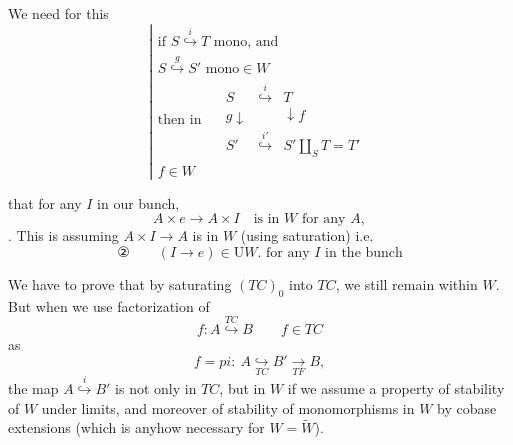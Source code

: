 \documentclass[11pt,a4paper]{article}
\begin{document}
We need for this
\[
  \left|
  \begin{array}{l}
    \text{if } S \overset{i}{\hookrightarrow} T \text{ mono, and} \\
    S \overset{g}{\hookrightarrow} S' \text{ mono} \in W \\
    \text{then in } \quad
    \begin{array}{ccc}
      S & \overset{i}{\hookrightarrow} & T \\
      {\scriptstyle g} \downarrow & & \downarrow {\scriptstyle f} \\
      S' & \overset{i'}{\hookrightarrow} & S' \amalg_S T = T'
    \end{array} \\
    f \in W
  \end{array}
  \right.
\]


 that for any  $I$ \struck{\ill{}} in our
bunch,
\[
  A \times e \to A \times I \quad \text{is in } W \text{ for any } A,
\]
.
This is  \struck{\ill{}} assuming
$A \times I \to A$ is in $W$ (using saturation) i.e.
\[
  \text{②}\qquad
  \boxed{(I \to e) \in \mathrm{U}W. \text{ for any } I \text{ in the bunch}}
\]

We have to prove that by saturating $(TC)_0$ into $TC$, we still remain
within $W$. But when we use factorization of
\[
  f : A \overset{TC}{\hookrightarrow} B \qquad f \in TC
\]
as
\[
  f = pi : \ A \underset{TC}{\hookrightarrow} B' \underset{TF}{\longrightarrow} B ,
\]
the map $A \overset{i}{\hookrightarrow} B'$ is not only in $TC$, but
 in $W$ if we assume a property of stability of $W$ under
 limits, 
and moreover  of 
stability of monomorphisms in $W$ by cobase extensions  (which
is anyhow necessary for $W = \widetilde{W}$). 
\end{document}
